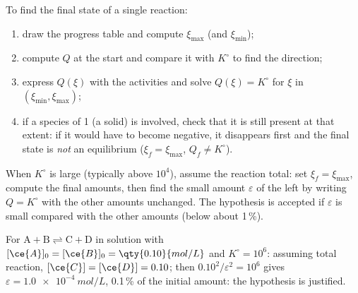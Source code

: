 \begin{method}\label{met:b1:extent-q-and-k:final-state}
To find the final state of a single reaction:
\begin{enumerate}
  \item draw the progress table and compute $\xi_{\max}$ (and $\xi_{\min}$);
  \item compute $Q$ at the start and compare it with $K^\circ$ to find the
        direction;
  \item express $Q(\xi)$ with the activities and solve $Q(\xi) = K^\circ$
        for $\xi$ in $(\xi_{\min}, \xi_{\max})$;
  \item if a species of  1 (a solid) is involved, check that it is
        still present at that extent: if it would have to become negative,
        it disappears first and the final state is \emph{not} an
        equilibrium ($\xi_f = \xi_{\max}$, $Q_f \ne K^\circ$).
\end{enumerate}
\end{method}

\begin{method}\label{met:b1:extent-q-and-k:quantitative}
When $K^\circ$ is large (typically above $10^4$), assume the reaction
total: set $\xi_f = \xi_{\max}$, compute the final amounts, then find the
small amount $\varepsilon$ of the  left by writing $Q =
K^\circ$ with the other amounts unchanged. The hypothesis is accepted if
$\varepsilon$ is small compared with the other amounts (below about
1\,\%).
\end{method}

\begin{example}\label{ex:b1:extent-q-and-k:quant}
For $\mathrm{A + B \rightleftharpoons C + D}$ in solution with $[\ce{A}]_0 = [\ce{B}]_0 =
\qty{0.10}{mol/L}$ and $K^\circ = 10^6$: assuming total reaction, $[\ce{C}]
= [\ce{D}] = 0.10$; then $0.10^2/\varepsilon^2 = 10^6$ gives $\varepsilon
= \qty{1.0e-4}{mol/L}$, 0.1\,\% of the initial amount: the hypothesis is
justified.
\end{example}

